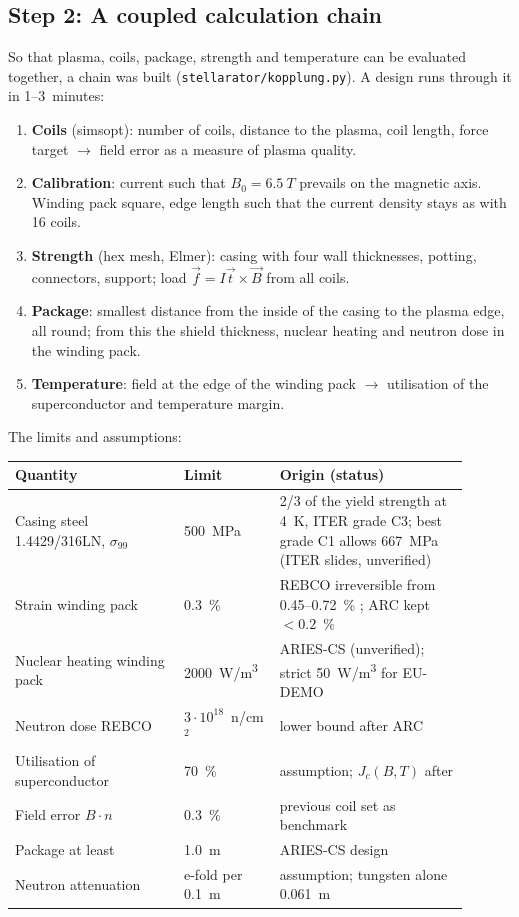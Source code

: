 \subsection*{Step 2: A coupled calculation chain}
So that plasma, coils, package, strength and temperature can be evaluated together, a chain was built
(\texttt{stellarator/kopplung.py}). A design runs through it in 1--3~minutes:
\begin{enumerate}\itemsep1pt
\item \textbf{Coils} (simsopt): number of coils, distance to the plasma, coil length, force target $\to$ field error as
  a measure of plasma quality.
\item \textbf{Calibration}: current such that $B_0 = \SI{6.5}{T}$ prevails on the magnetic axis. Winding pack square,
  edge length such that the current density stays as with 16 coils.
\item \textbf{Strength} (hex mesh, Elmer): casing with four wall thicknesses, potting, connectors, support; load
  $\vec f = I\vec t\times\vec B$ from all coils.
\item \textbf{Package}: smallest distance from the inside of the casing to the plasma edge, all round; from this the
  shield thickness, nuclear heating and neutron dose in the winding pack.
\item \textbf{Temperature}: field at the edge of the winding pack $\to$ utilisation of the superconductor and temperature
  margin.
\end{enumerate}
The limits and assumptions:
\begin{center}\small
\begin{tabular}{p{0.34\linewidth}p{0.18\linewidth}p{0.38\linewidth}}
\toprule
Quantity & Limit & Origin (status) \\
\midrule
Casing steel 1.4429/316LN, $\sigma_{99}$ & \SI{500}{MPa} & 2/3 of the yield strength at 4~K, ITER grade C3; best grade C1 allows 667~MPa (ITER slides, unverified) \\
Strain winding pack & 0.3~\% & REBCO irreversible from 0.45--0.72~\% \cite{barth2015}; ARC kept $<0.2$~\% \cite{sorbom2015} \\
Nuclear heating winding pack & \SI{2000}{W/m^3} & ARIES-CS (unverified); strict \SI{50}{W/m^3} for EU-DEMO \cite{cufar2019} \\
Neutron dose REBCO & $3\cdot10^{18}$~n/cm$^2$ & lower bound after ARC \cite{sorbom2015} \\
Utilisation of superconductor & 70~\% & assumption; $J_c(B,T)$ after \cite{senatore2024,pardo2026} \\
Field error $B\cdot n$ & 0.3~\% & previous coil set as benchmark \\
Package at least & \SI{1.0}{m} & ARIES-CS design \cite{elguebaly2005} \\
Neutron attenuation & e-fold per \SI{0.1}{m} & assumption; tungsten alone \SI{0.061}{m} \cite{windsor2021} \\
\bottomrule
\end{tabular}
\end{center}
